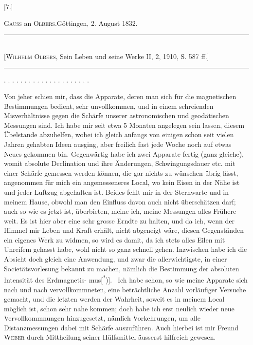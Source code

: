 \clearpage\begingroup{}

\begin{center}[7.]\end{center}
\begin{center}\textsc{Gauss} an \textsc{Olbers}.\quad Göttingen, 2. August 1832.\end{center}
\begin{center}
\rule{.74\textwidth}{.4pt}\\
{\small [\textsc{Wilhelm Olbers}, Sein Leben und seine Werke II, 2, 1910, S. 587 ff.]}\\[-.3ex]
\rule{.74\textwidth}{.4pt}
\end{center}
\noindent . . . . . . . . . . . . . . . . . . . . .\par
\indent Von jeher schien mir, dass die Apparate, deren man sich für die magnetischen
Bestimmungen bedient, sehr unvollkommen, und in einem schreienden
Misverhältnisse gegen die Schärfe unserer astronomischen und geodätischen
Messungen sind. Ich habe mir seit etwa 5 Monaten angelegen sein lassen,
diesem Übelstande abzuhelfen, wobei ich gleich anfangs von einigen schon
seit vielen Jahren gehabten Ideen ausging, aber freilich fast jede Woche noch
auf etwas Neues gekommen bin. Gegenwärtig habe ich zwei Apparate fertig
(ganz gleiche), womit absolute Declination und ihre Änderungen, Schwingungsdauer
etc. mit einer Schärfe gemessen werden können, die gar nichts zu wünschen
übrig lässt, angenommen für mich ein angemesseneres Local, wo kein
Eisen in der Nähe ist und jeder Luftzug abgehalten ist. Beides fehlt mir in
der Sternwarte und in meinem Hause, obwohl man den Einfluss davon auch
nicht überschätzen darf; auch so wie es jetzt ist, überbieten, meine ich, meine
Messungen alles Frühere  weit. Es ist hier aber eine sehr grosse Erndte
zu halten, und da ich, wenn der Himmel mir Leben und Kraft erhält, nicht
abgeneigt wäre, diesen Gegenständen ein eigenes Werk zu widmen, so wird
es damit, da ich stets alles Eilen mit Unreifem gehasst habe, wohl nicht so
ganz schnell gehen. Inzwischen habe ich die Absicht doch gleich eine Anwendung,
und zwar die allerwichtigste, in einer Societätsvorlesung bekannt zu
machen, nämlich die Bestimmung der absoluten Intensität des Erdmagnetis-
\clearpage{}
\noindent mus[\textsuperscript{*})].\begingroup\renewcommand{\thefootnote}{}
\endgroup\ Ich habe schon, so wie meine Apparate sich nach und nach vervollkommneten,
eine beträchtliche Anzahl vorläufiger Versuche gemacht, und die
letzten werden der Wahrheit, soweit es in meinem Local möglich ist, schon
sehr nahe kommen; doch habe ich erst neulich wieder neue Vervollkommnungen
hinzugesetzt, nämlich Vorkehrungen, um alle Distanzmessungen dabei
mit  Schärfe auszuführen. Auch hierbei ist mir Freund
\textsc{Weber} durch Mittheilung seiner Hülfsmittel äusserst hilfreich gewesen.

